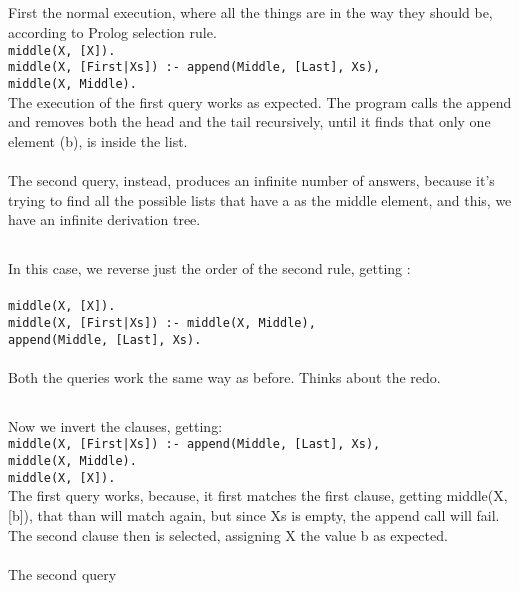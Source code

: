 \documentclass{article}
\begin{document}
\subsection{}
First the normal execution, where all the things are in the way they should be, according to Prolog selection rule.\\
    \texttt{middle(X, [X]).\\
        middle(X, [First|Xs]) :- append(Middle, [Last], Xs),\\
        \hspace*{4.45cm} middle(X, Middle).}\\
The execution of the first query works as expected. The program calls the append and removes both the head and the tail recursively, until it finds that only one element (b), is inside the list.\\ \\ %
The second query, instead, produces an infinite number of answers, because it's trying to find all the possible lists that have a as the middle element, and this, we have an infinite derivation tree.\\
\subsection{}
In this case, we reverse just the order of the second rule, getting : \\ \\
\texttt{middle(X, [X]).\\
        middle(X, [First|Xs]) :- middle(X, Middle),\\
        \hspace*{4.45cm} append(Middle, [Last], Xs).}
\\ \\
Both the queries work the same way as before. Thinks about the redo.
\subsection{}
Now we invert the clauses, getting:\\
\texttt{middle(X, [First|Xs]) :- append(Middle, [Last], Xs),\\
        \hspace*{4.45cm} middle(X, Middle).\\
        middle(X, [X]).}\\
The first query works, because, it first matches the first clause, getting middle(X, [b]), that than will match again, but since Xs is empty, the append call will fail. The second clause then is selected, assigning X the value b as expected.\\ \\
The second query 
\end{document}
